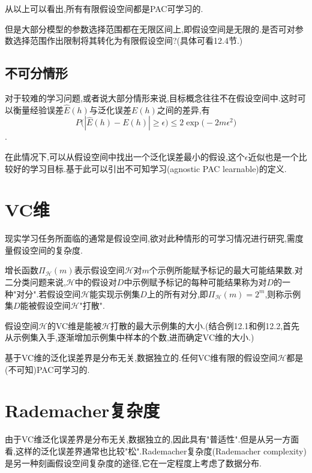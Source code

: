 从以上可以看出,所有有限假设空间都是PAC可学习的.

但是大部分模型的参数选择范围都在无限区间上,即假设空间是无限的.是否可对参数选择范围作出限制将其转化为有限假设空间?(具体可看12.4节.)

\subsection{不可分情形}

对于较难的学习问题,或者说大部分情形来说,目标概念往往不在假设空间中.这时可以衡量经验误差$\widehat E(h)$与泛化误差$E(h)$之间的差异,有
\begin{equation}
P\Big(|\widehat E(h)-E(h)|\ge\epsilon\Big)\le2\exp\Big(-2m\epsilon^2\Big)
\end{equation}
.

在此情况下,可以从假设空间中找出一个泛化误差最小的假设,这个$\epsilon$近似也是一个比较好的学习目标.基于此可以引出不可知学习(agnostic PAC learnable)的定义.

\section{VC维}

现实学习任务所面临的通常是假设空间,欲对此种情形的可学习情况进行研究,需度量假设空间的复杂度.

增长函数$\Pi_\mathcal H(m)$表示假设空间$\mathcal H$对$m$个示例所能赋予标记的最大可能结果数.对二分类问题来说,$\mathcal H$中的假设对$D$中示例赋予标记的每种可能结果称为对$D$的一种"对分".若假设空间$\mathcal H$能实现示例集$D$上的所有对分,即$\Pi_\mathcal H(m)=2^m$,则称示例集$D$能被假设空间$\mathcal H$"打散".

假设空间$\mathcal H$的VC维是能被$\mathcal H$打散的最大示例集的大小.(结合例12.1和例12.2,首先从示例集入手,逐渐增加示例集中样本的个数,进而确定VC维的大小.)

基于VC维的泛化误差界是分布无关,数据独立的.任何VC维有限的假设空间$\mathcal H$都是(不可知)PAC可学习的.

\section{Rademacher复杂度}

由于VC维泛化误差界是分布无关,数据独立的,因此具有"普适性".但是从另一方面看,这样的泛化误差界通常也比较"松".Rademacher复杂度(Rademacher complexity)是另一种刻画假设空间复杂度的途径,它在一定程度上考虑了数据分布.

